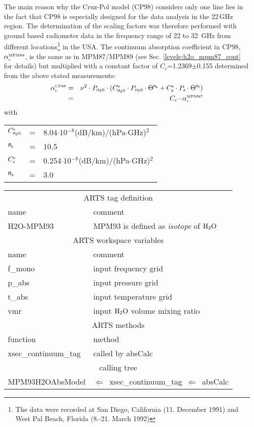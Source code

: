 The main reason why the Cruz-Pol model (CP98) considers only one line
lies in the fact that CP98 is especially designed for the data analysis
in the 22\,GHz region. The determination of the scaling factors was therefore
performed with ground based radiometer data in the frequency range of
22 to 32 \,GHz from different locations\footnote{The data were
  recorded at San Diego, California (11. December 1991) and West Pal
  Beach, Florida (8.-21. March 1992)} in the USA.
%
\label{levele:cp98_cont}
The continuum absorption coefficient in CP98, $\alpha^{\mbox{\rm \tiny MPM89}}_{\mbox{\tiny c}}$, 
is the same as in MPM87/MPM89 (see Sec. \ref{levele:h2o_mpm87_cont} for 
details) but multiplied with a constant factor of $C_c$=1.2369$\pm$0.155 determined 
from the above stated measurements:\\
\begin{eqnarray} 
  \label{eq:cp98:cont}
  \alpha^{\mbox{\tiny \rm CP98}}_{\mbox{\tiny c}} &=& \nu^2 \cdot P_{\mbox{\tiny \sf H}_{2}\mbox{\tiny \sf O}} \cdot 
                (C^{\mbox{\tiny \sf o}}_{\mbox{\tiny \sf H}_{2}\mbox{\tiny \sf O}} \cdot P_{\mbox{\tiny \sf H}_{2}\mbox{\tiny \sf O}} \cdot \Theta^{{\sf n}_{\mbox{\tiny \sf s}}} + 
                 C^{\mbox{\tiny \sf o}}_{\mbox{\tiny \sf d}} \cdot P_{\mbox{\tiny \sf d}}  \cdot \Theta^{{\sf n}_{\mbox{\tiny \sf f}}})\\
            &=& C_c \cdot \alpha^{\mbox{\rm \tiny MPM87}}_{\mbox{\tiny c}}
\nonumber
\end{eqnarray}
with\\
\begin{tabular}{lcl}
$C^{\mbox{\tiny \sf o}}_{\mbox{\tiny \sf H}_{2}\mbox{\tiny \sf O}}$   & = & 8.04$\cdot$10$^{-8}$(dB/km)/(hPa$\cdot$GHz)$^2$\\
${\sf n}_{\mbox{\tiny \sf s}}$    & = & 10.5\\
$C^{\mbox{\tiny \sf o}}_{\mbox{\tiny \sf d}}$   & = & 0.254$\cdot$10$^{-8}$(dB/km)/(hPa$\cdot$GHz)$^2$\\
${\sf n}_{\mbox{\tiny \sf d}}$    & = & 3.0\\
\end{tabular}
%
%
\begin{center}
\begin{tabular}{ll}
\hline
\multicolumn{2}{c}{ARTS tag definition}\\
name      & comment \\
H2O-MPM93 & MPM93 is defined as {\it isotope} of $\mbox{H}_2\mbox{O}$\\
\hline
\multicolumn{2}{c}{ARTS workspace variables}\\
name & comment \\
 f\_mono & input frequency grid \\
 p\_abs  & input pressure grid \\
 t\_abs  & input temperature grid\\
 vmr    & input $\mbox{H}_2\mbox{O}$ volume mixing ratio\\
\hline
\multicolumn{2}{c}{ARTS methods}\\
function           & method\\
xsec\_continuum\_tag & called by absCalc \\
\hline
\multicolumn{2}{c}{calling tree}\\
MPM93H2OAbsModel & $\Leftarrow$~xsec\_continuum\_tag~$\Leftarrow$~absCalc\\
\end{tabular}
\end{center}

